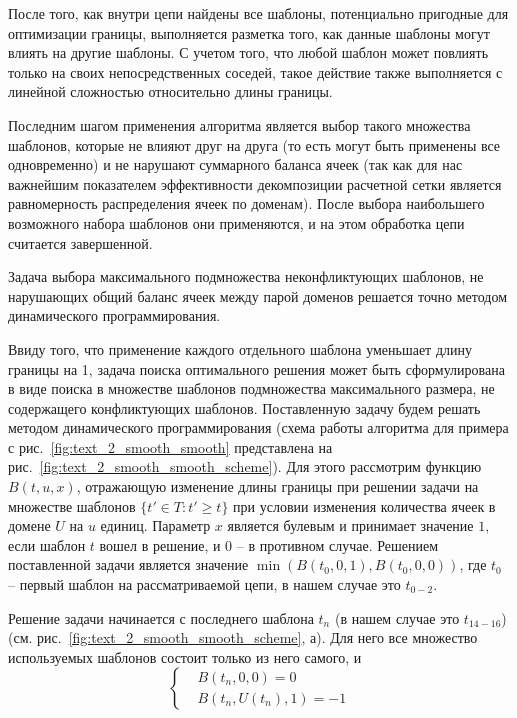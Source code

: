 \documentclass[a4paper,14pt]{extarticle}                     %
\theoremstyle{plain}                                         %
\begin{document}
После того, как внутри цепи найдены все шаблоны, потенциально пригодные для оптимизации границы, выполняется разметка того, как данные шаблоны могут влиять на другие шаблоны.
С учетом того, что любой шаблон может повлиять только на своих непосредственных соседей, такое действие также выполняется с линейной сложностью относительно длины границы.

Последним шагом применения алгоритма является выбор такого множества шаблонов, которые не влияют друг на друга (то есть могут быть применены все одновременно) и не нарушают суммарного баланса ячеек (так как для нас важнейшим показателем эффективности декомпозиции расчетной сетки является равномерность распределения ячеек по доменам).
После выбора наибольшего возможного набора шаблонов они применяются, и на этом обработка цепи считается завершенной.

Задача выбора максимального подмножества неконфликтующих шаблонов, не нарушающих общий баланс ячеек между парой доменов решается точно методом динамического программирования.

Ввиду того, что применение каждого отдельного шаблона уменьшает длину границы на 1, задача поиска оптимального решения может быть сформулирована в виде поиска в множестве шаблонов подмножества максимального размера, не содержащего конфликтующих шаблонов.
Поставленную задачу будем решать методом динамического программирования (схема работы алгоритма для примера с рис.~\ref{fig:text_2_smooth_smooth} представлена на рис.~\ref{fig:text_2_smooth_smooth_scheme}).
Для этого рассмотрим функцию $B(t, u, x)$, отражающую изменение длины границы при решении задачи на множестве шаблонов $\{ t' \in T : t' \ge t \}$ при условии изменения количества ячеек в домене $U$ на $u$ единиц.
Параметр $x$ является булевым и принимает значение $1$, если шаблон $t$ вошел в решение, и $0$ -- в противном случае.
Решением поставленной задачи является значение $\min(B(t_0, 0, 1), B(t_0, 0, 0))$, где $t_0$ -- первый шаблон на рассматриваемой цепи, в нашем случае это $t_{0-2}$.

Решение задачи начинается с последнего шаблона $t_n$ (в нашем случае это $t_{14-16}$) (см. рис.~\ref{fig:text_2_smooth_smooth_scheme}, а).
Для него все множество используемых шаблонов состоит только из него самого, и
\begin{equation}
	\left\{
		\begin{aligned}
			& B(t_n, 0, 0) = 0 \\
			& B(t_n, U(t_n), 1) = -1
		\end{aligned}
	\right.
\end{equation}
\end{document}
